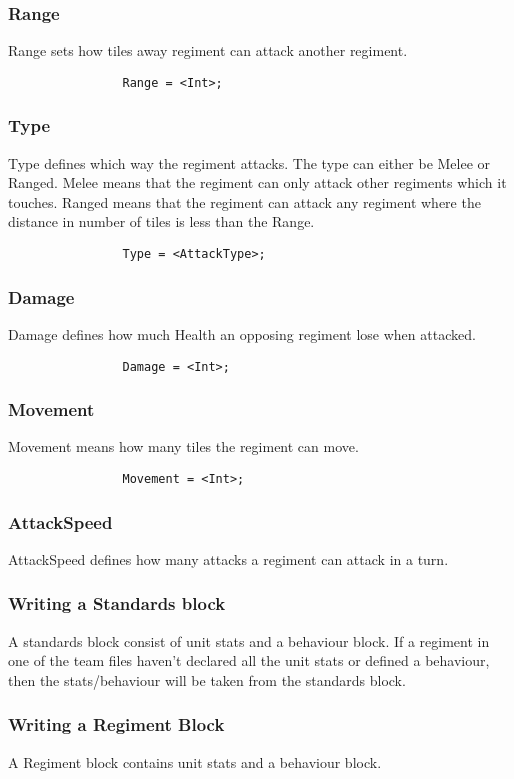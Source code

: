 		\subsubsection{Range}
			Range sets how tiles away regiment can attack another regiment.
			\begin{verbatim}
				Range = <Int>;
			\end{verbatim}
		\subsubsection{Type}
			Type defines which way the regiment attacks. The type can either be Melee or Ranged.
			Melee means that the regiment can only attack other regiments which it touches. Ranged means 
			that the regiment can attack any regiment where the distance in number of tiles is less than the Range.
			\begin{verbatim}
				Type = <AttackType>; 
			\end{verbatim}	
		\subsubsection{Damage}
			Damage defines how much Health an opposing regiment lose when attacked.
			\begin{verbatim}
				Damage = <Int>;
			\end{verbatim}
		\subsubsection{Movement}
			Movement means how many tiles the regiment can move.
			\begin{verbatim}
				Movement = <Int>;
			\end{verbatim}
		\subsubsection{AttackSpeed}
			AttackSpeed defines how many attacks a regiment can attack in a turn.
			
			
		\subsubsection{Writing a Standards block}
			A standards block consist of unit stats and a behaviour block. If a regiment in one of the team files haven't declared all the unit stats
			or defined a behaviour, then the stats/behaviour will be taken from the standards block.
		\subsubsection{Writing a Regiment Block}
			A Regiment block contains unit stats and a behaviour block.
